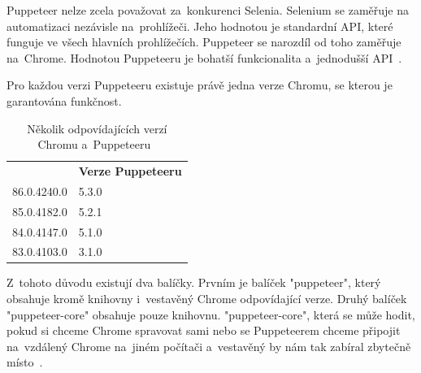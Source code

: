 \documentclass[12pt, a4paper, twoside]{article}
\begin{document}
	Puppeteer nelze zcela považovat za~konkurenci Selenia. Selenium se zaměřuje na~ automatizaci nezávisle na~prohlížeči. Jeho hodnotou je standardní API, které funguje ve všech hlavních prohlížečích. Puppeteer se narozdíl od toho zaměřuje na~Chrome. Hodnotou Puppeteeru je bohatší funkcionalita a~jednodušší API~\cite{puppeteerMainPage}. 
	
	Pro každou verzi Puppeteeru existuje právě jedna verze Chromu, se kterou je garantována funkčnost. 
	\begin{table}[H]
		\centering
		\begin{tabular}{ l|l } 
			\rowcolor{tableHeadingBackground}
			\multicolumn{1}{l}{\textbf{Verze Chromu}} & \multicolumn{1}{l}{\textbf{Verze Puppeteeru}} \\
			86.0.4240.0 & 5.3.0 \\ 
			85.0.4182.0 & 5.2.1 \\
			84.0.4147.0 & 5.1.0 \\
			83.0.4103.0 & 3.1.0
		\end{tabular}
		\caption{Několik odpovídajících verzí Chromu a~Puppeteeru~\cite{puppeteerApi}}
	\end{table}

	Z~tohoto důvodu existují dva balíčky. Prvním je balíček "puppeteer", který obsahuje kromě knihovny i~vestavěný Chrome odpovídající verze. Druhý balíček "puppeteer-core" obsahuje pouze knihovnu. "puppeteer-core", která se může hodit, pokud si chceme Chrome spravovat sami nebo se Puppeteerem chceme připojit na~vzdálený Chrome na~jiném počítači a~vestavěný by nám tak zabíral zbytečně místo~\cite{puppeteerMainPage}.
	
\end{document}
